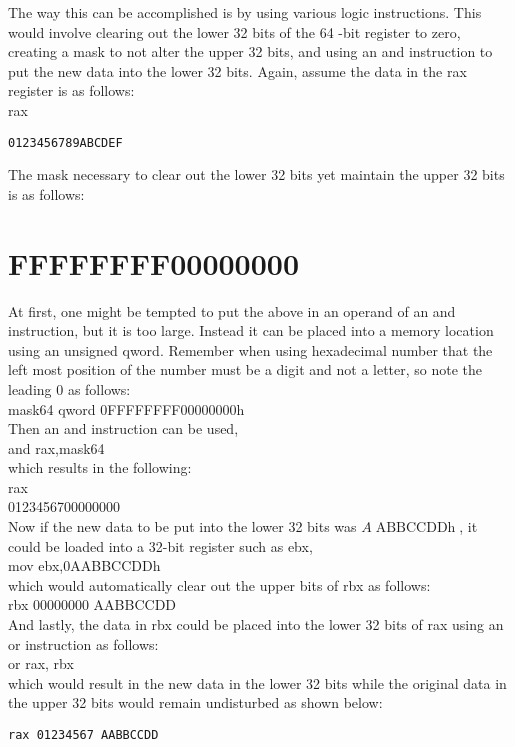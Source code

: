 \documentclass[10pt]{article}
\begin{document}
The way this can be accomplished is by using various logic instructions. This would involve clearing out the lower 32 bits of the 64 -bit register to zero, creating a mask to not alter the upper 32 bits, and using an and instruction to put the new data into the lower 32 bits. Again, assume the data in the rax register is as follows:\\
rax

\begin{verbatim}
0123456789ABCDEF
\end{verbatim}

The mask necessary to clear out the lower 32 bits yet maintain the upper 32 bits is as follows:

\section*{FFFFFFFF00000000}
At first, one might be tempted to put the above in an operand of an and instruction, but it is too large. Instead it can be placed into a memory location using an unsigned qword. Remember when using hexadecimal number that the left most position of the number must be a digit and not a letter, so note the leading 0 as follows:\\
mask64 qword 0FFFFFFFF00000000h\\
Then an and instruction can be used,\\
and rax,mask64\\
which results in the following:\\
rax\\
0123456700000000\\
Now if the new data to be put into the lower 32 bits was $A \operatorname{ABBCCDDh}$, it could be loaded into a 32-bit register such as ebx,\\
mov ebx,0AABBCCDDh\\
which would automatically clear out the upper bits of rbx as follows:\\
rbx 00000000 AABBCCDD\\
And lastly, the data in rbx could be placed into the lower 32 bits of rax using an or instruction as follows:\\
or rax, rbx\\
which would result in the new data in the lower 32 bits while the original data in the upper 32 bits would remain undisturbed as shown below:

\begin{verbatim}
rax 01234567 AABBCCDD
\end{verbatim}
\end{document}
